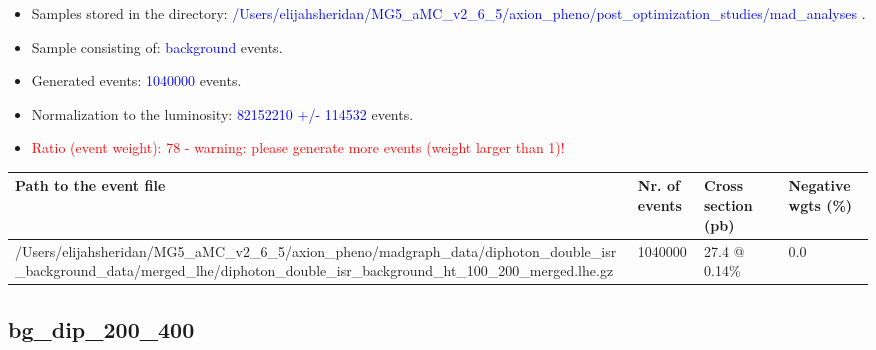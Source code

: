 \documentclass[a4paper, 10pt]{article}
\begin{document}
\begin{itemize}
  \item Samples stored in the directory: \textcolor{blue}{/\-Users/\-elijahsheridan/\-MG5\_aMC\_v2\_6\_5/\-axion\_pheno/\-post\_optimization\_studies/\-mad\_analyses} .
   \item Sample consisting of: \textcolor{blue}{background}  events.
   \item Generated events: \textcolor{blue}{1040000 }  events.
   \item Normalization to the luminosity: \textcolor{blue}{82152210}\textcolor{blue}{ +/\-- }\textcolor{blue}{114532 }  events.
   \item\textcolor{red}{Ratio (event weight): }\textcolor{red}{78 }\textcolor{red}{ - warning: please generate more events (weight larger than 1)!}
\textcolor{red}{}
\end{itemize}
\begin{table}[H]
  \begin{center}
    \begin{tabular}{|m{55.0mm}|m{25.0mm}|m{30.0mm}|m{30.0mm}|}
      \hline
      {\cellcolor{yellow}         Path to the event file}& {\cellcolor{yellow}         Nr. of events}& {\cellcolor{yellow}         Cross section (pb)}& {\cellcolor{yellow}         Negative wgts (\%)}\\
      \hline
      {\cellcolor{white}          /\-Users/\-elijahsheridan/\-MG5\_aMC\_v2\_6\_5/\-axion\_pheno/\-madgraph\_data/\-diphoton\_double\_isr\_background\_data/\-merged\_lhe/\-diphoton\_double\_isr\_background\_ht\_100\_200\_merged.lhe.gz}& {\cellcolor{white}          1040000}& {\cellcolor{white}          27.4 @ 0.14\%}& {\cellcolor{white}          0.0}\\
\hline
    \end{tabular}
  \end{center}
\end{table}

\subsection{ bg\_dip\_200\_400}
\end{document}
